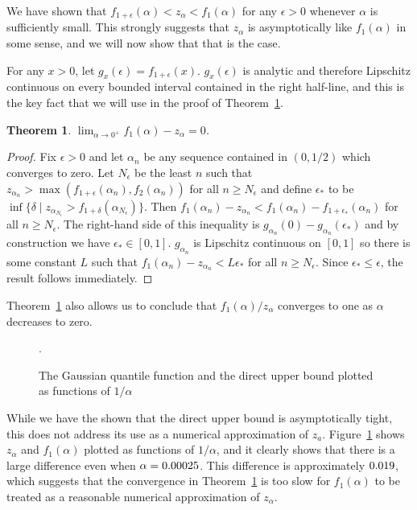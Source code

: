 \documentclass[12pt]{article}
\newtheorem{theorem}{Theorem}
\numberwithin{theorem}{section}
\begin{document}
We have shown that $f_{1 + \epsilon}(\alpha) < z_\alpha < f_1(\alpha)$ for any $\epsilon > 0$ whenever $\alpha$ is sufficiently small.  This strongly suggests that $z_\alpha$ is asymptotically like $f_1(\alpha)$ in some sense, and we will now show that that is the case.

For any $x > 0$, let $g_x(\epsilon) = f_{1 + \epsilon}(x)$.  $g_x(\epsilon)$ is analytic and therefore Lipschitz continuous on every bounded interval contained in the right half-line, and this is the key fact that we will use in the proof of Theorem~\ref{thm_tight_diff}.

\begin{theorem}
\label{thm_tight_diff}
$\displaystyle\lim_{\alpha \rightarrow 0^+} f_1(\alpha) - z_\alpha = 0$.
\end{theorem}
\begin{proof}
Fix $\epsilon > 0$ and let $\alpha_n$ be any sequence contained in $(0, 1/2)$ which converges to zero.  Let $N_\epsilon$ be the least $n$ such that $z_{\alpha_n} > \max(f_{1 + \epsilon}(\alpha_n), f_2(\alpha_n))$ for all $n \geq N_\epsilon$ and define $\epsilon_*$ to be $\inf\{\delta \mid z_{\alpha_{N_\epsilon}} > f_{1 + \delta}(\alpha_{N_\epsilon})\}$.  Then $f_1(\alpha_n) - z_{\alpha_n} < f_1(\alpha_n) - f_{1 + \epsilon_*}(\alpha_n)$ for all $n \geq N_\epsilon$.  The right-hand side of this inequality is $g_{\alpha_n}(0) - g_{\alpha_n}(\epsilon_*)$ and by construction we have $\epsilon_* \in [0, 1]$.  $g_{\alpha_n}$ is Lipschitz continuous on $[0, 1]$ so there is some constant $L$ such that $f_1(\alpha_n) - z_{\alpha_n} < L\epsilon_*$ for all $n \geq N_\epsilon$.  Since $\epsilon_* \leq \epsilon$, the result follows immediately.
\end{proof}

\noindent
Theorem~\ref{thm_tight_diff} also allows us to conclude that $f_1(\alpha) / z_\alpha$ converges to one as $\alpha$ decreases to zero.

\begin{figure}[t]
\centering

\caption{The Gaussian quantile function and the direct upper bound plotted as functions of $1 / \alpha$}.
\label{fig_bound}
\end{figure}

While we have the shown that the direct upper bound is asymptotically tight, this does not address its use as a numerical approximation of $z_a$.  Figure~\ref{fig_bound} shows $z_\alpha$ and $f_1(\alpha)$ plotted as functions of $1 / \alpha$, and it clearly shows that there is a large difference even when $\alpha = 0.00025$.  This difference is approximately $0.019$, which suggests that the convergence in Theorem~\ref{thm_tight_diff} is too slow for $f_1(\alpha)$ to be treated as a reasonable numerical approximation of $z_\alpha$.
\end{document}
